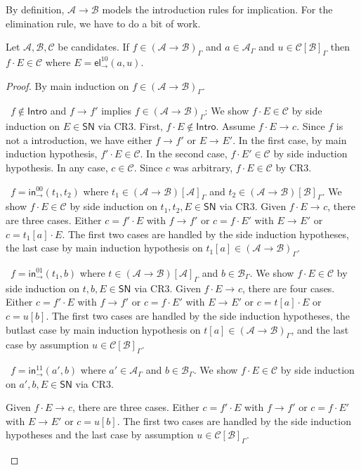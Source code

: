 \documentclass[a4paper,USenglish,cleveref, autoref, thm-restate]{lipics-v2019}
\newenvironment{caselist}{%
  \begin{list}{{\it Case}}{%
  }%
}{\end{list}%
}
\newcommand{\nextcase}{\item~}
\newcommand{\tin}{\ensuremath{\mathsf{in}}}
\newcommand{\inn}[2]{\tin_{#1}^{#2}}
\newcommand{\tel}{\mathsf{el}}
\newcommand{\el}[2]{\tel_{#1}^{#2}}
\newcommand{\red}[1][]{\longrightarrow_{#1}}
\newcommand{\A}{\mathcal{A}}
\newcommand{\B}{\mathcal{B}}
\newcommand{\C}{\mathcal{C}}
\newcommand{\SN}{\mathsf{SN}}
\newcommand{\Intro}{\mathsf{Intro}}
\begin{document}
By definition, $\A \to \B$ models the introduction rules for
implication.  For the elimination rule, we have to do a bit of work.
\begin{lemma}
  \label{lem:app}
  Let $\A,\B,\C$ be candidates.
  If $f \in (\A \to \B)_\Gamma$ and $a \in \A_\Gamma$ and
  $u \in \C[\B]_\Gamma$ then $f \cdot E \in \C$
  where $E = \el\to{10}(a,u)$.
\end{lemma}
\begin{proof}
  By main induction on $f \in (\A \to \B)_\Gamma$.
  \begin{caselist}

    \nextcase $f \not\in \Intro$ and $f \red f'$ implies
    $f \in (\A \to \B)_\Gamma$:
    We show $f \cdot E \in \C$ by side induction on $E \in \SN$ via CR3.
    First, $f \cdot E \not\in\Intro$.
    Assume $f \cdot E \red c$.  Since $f$ is not a introduction, we
    have either $f \red f'$ or $E \red E'$.  In the first case, by
    main induction hypothesis, $f' \cdot E \in \C$.
    In the second case, $f \cdot E' \in \C$ by side induction hypothesis.
    In any case, $c \in \C$.  Since $c$ was arbitrary, $f \cdot E \in
    \C$ by CR3.

    \nextcase $f = \inn\to{00}(t_1,t_2)$ where
    $t_1 \in (\A \to \B)[\A]_\Gamma$ and
    $t_2 \in (\A \to \B)[\B]_\Gamma$.
    We show $f \cdot E \in \C$ by side induction on $t_1,t_2,E \in
    \SN$ via CR3.
    Given $f \cdot E \red c$, there are three cases.  Either $c = f' \cdot
    E$ with $f \red f'$ or $c = f \cdot E'$ with $E \red E'$ or $c =
    t_1[a] \cdot E$.  The first two cases are handled by the side
    induction hypotheses, the last case by main induction hypothesis
    on $t_1[a] \in (\A \to \B)_\Gamma$.

    \nextcase $f = \inn\to{01}(t_1,b)$ where
    $t \in (\A \to \B)[\A]_\Gamma$ and
    $b \in \B_\Gamma$.
    We show $f \cdot E \in \C$ by side induction on $t,b,E \in
    \SN$ via CR3.
    Given $f \cdot E \red c$, there are four cases.  Either $c = f' \cdot
    E$ with $f \red f'$ or $c = f \cdot E'$ with $E \red E'$ or $c =
    t[a] \cdot E$ or $c = u[b]$.  The first two cases are handled by the side
    induction hypotheses, the butlast case by main induction hypothesis
    on $t[a] \in (\A \to \B)_\Gamma$, and the last case by assumption
    $u \in \C[\B]_\Gamma$.

    \nextcase $f = \inn\to{11}(a',b)$ where
    $a' \in \A_\Gamma$ and
    $b \in \B_\Gamma$.
    We show $f \cdot E \in \C$ by side induction on $a',b,E \in
    \SN$ via CR3.

    Given $f \cdot E \red c$, there are three cases.  Either
    $c = f' \cdot E$ with $f \red f'$ or $c = f \cdot E'$ with
    $E \red E'$ or $c = u[b]$.  The first two cases are handled by the
    side induction hypotheses and the last case by
    assumption $u \in \C[\B]_\Gamma$.

  \end{caselist}
\end{proof}
\end{document}
